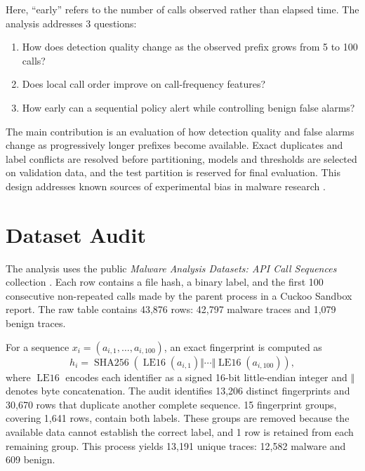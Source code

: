 \documentclass[10pt,twocolumn]{article}
\begin{document}
Here, ``early'' refers to the number of calls observed rather than elapsed time. The analysis addresses 3 questions:
\begin{enumerate}[label=(\arabic*),leftmargin=2.2em,itemsep=1pt,topsep=2pt]
 \item How does detection quality change as the observed prefix grows from 5 to 100 calls?
 \item Does local call order improve on call-frequency features?
 \item How early can a sequential policy alert while controlling benign false alarms?
\end{enumerate}

The main contribution is an evaluation of how detection quality and false alarms change as progressively longer prefixes become available. Exact duplicates and label conflicts are resolved before partitioning, models and thresholds are selected on validation data, and the test partition is reserved for final evaluation. This design addresses known sources of experimental bias in malware research \cite{pendlebury2019}.

\section{Dataset Audit}
The analysis uses the public \emph{Malware Analysis Datasets: API Call Sequences} collection \cite{oliveira2019}. Each row contains a file hash, a binary label, and the first 100 consecutive non-repeated calls made by the parent process in a Cuckoo Sandbox report. The raw table contains 43,876 rows: 42,797 malware traces and 1,079 benign traces.

For a sequence $x_i=(a_{i,1},\ldots,a_{i,100})$, an exact fingerprint is computed as
\begin{equation}
 h_i=\operatorname{SHA256}\!\left(
 \operatorname{LE16}(a_{i,1})\Vert\cdots\Vert
 \operatorname{LE16}(a_{i,100})\right),
 \label{eq:hash}
\end{equation}
where $\operatorname{LE16}$ encodes each identifier as a signed 16-bit little-endian integer and $\Vert$ denotes byte concatenation. The audit identifies 13,206 distinct fingerprints and 30,670 rows that duplicate another complete sequence. 15 fingerprint groups, covering 1,641 rows, contain both labels. These groups are removed because the available data cannot establish the correct label, and 1 row is retained from each remaining group. This process yields 13,191 unique traces: 12,582 malware and 609 benign.
\end{document}
